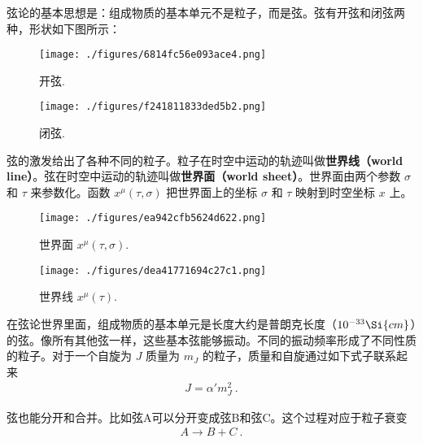 
\begin{issues}
\issueNeedCite
\issueMissDepend
\end{issues}

弦论的基本思想是：组成物质的基本单元不是粒子，而是弦。弦有开弦和闭弦两种，形状如下图所示：
\begin{figure}[ht]
\centering
\texttt{[image: ./figures/6814fc56e093ace4.png]}
\caption{开弦.} \label{fig_STover_1}
\end{figure}
\begin{figure}[ht]
\centering
\texttt{[image: ./figures/f241811833ded5b2.png]}
\caption{闭弦.} \label{fig_STover_2}
\end{figure}
弦的激发给出了各种不同的粒子。粒子在时空中运动的轨迹叫做\textbf{世界线（world line）}。弦在时空中运动的轨迹叫做\textbf{世界面（world sheet）}。世界面由两个参数 $\sigma$ 和 $\tau$ 来参数化。函数 $x^\mu(\tau,\sigma)$ 把世界面上的坐标 $\sigma$ 和 $\tau$ 映射到时空坐标 $x$ 上。

\begin{figure}[ht]
\centering
\texttt{[image: ./figures/ea942cfb5624d622.png]}
\caption{世界面 $x^\mu (\tau,\sigma)$.} \label{fig_STover_3}
\end{figure}

\begin{figure}[ht]
\centering
\texttt{[image: ./figures/dea41771694c27c1.png]}
\caption{世界线 $x^\mu(\tau)$.} \label{fig_STover_4}
\end{figure}

在弦论世界里面，组成物质的基本单元是长度大约是普朗克长度（$10^{-33}\Si{cm}$）的弦。像所有其他弦一样，这些基本弦能够振动。不同的振动频率形成了不同性质的粒子。对于一个自旋为 $J$ 质量为 $m_J$ 的粒子，质量和自旋通过如下式子联系起来
\begin{align}
J = \alpha' m_J^2~.
\end{align}

弦也能分开和合并。比如弦A可以分开变成弦B和弦C。这个过程对应于粒子衰变
\begin{align}
A \rightarrow B + C~.
\end{align}


